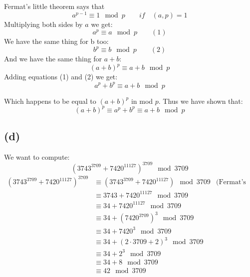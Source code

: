 \documentclass{article}
\begin{document}
Fermat's little theorem says that
\[
   a^{p-1} \equiv 1 \mod p \qquad if \quad (a,p) = 1
\]
Multiplying both sides by \(a\) we get:
\[
   a^p \equiv a \mod p \qquad (1)
\]
We have the same thing for b too:
\[
   b^p \equiv b \mod p \qquad (2)
\]
And we have the same thing for \(a + b\):
\[
   (a + b)^p \equiv a + b \mod p
\]
Adding equations (1) and (2) we get:
\[
   a^p + b^p \equiv a + b \mod p
\]

Which happens to be equal to \((a + b)^p\) in mod \(p\).
Thus we have shown that:
\[
   (a + b)^p \equiv a^p + b^p \equiv a + b \mod p
\]

\subsection*{(d)}

We want to compute:
\[
   (3743^{3709} + 7420^{11127})^{3709} \mod 3709
\]
\begin{align*}
   (3743^{3709} + 7420^{11127})^{3709} &\equiv (3743^{3709} + 7420^{11127}) \mod 3709 & \text{(Fermat's little theorem)} \\
   &\equiv 3743 + 7420^{11127} \mod 3709 \\
   &\equiv 34 + 7420^{11127} \mod 3709 \\
   &\equiv 34 + (7420^{3709})^3 \mod 3709 \\
   &\equiv 34 + 7420^3 \mod 3709 \\
   &\equiv 34 + (2 \cdot 3709 + 2)^3 \mod 3709 \\
   &\equiv 34 + 2^3 \mod 3709 \\
   &\equiv 34 + 8 \mod 3709 \\
   &\equiv 42 \mod 3709 \\
\end{align*}
\end{document}
